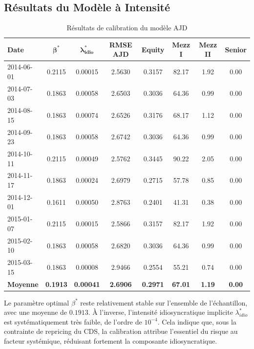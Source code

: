 \subsection{Résultats du Modèle à Intensité}

\begin{table}[H]
\centering
\caption{Résultats de calibration du modèle AJD}
\label{tab:ajd_calibration_results}
\scriptsize
\setlength{\tabcolsep}{3.5pt}
\renewcommand{\arraystretch}{1.12}
\begin{tabular}{lccccccc}
\toprule
\textbf{Date} & $\boldsymbol{\beta^{\ast}}$ & $\boldsymbol{\lambda_{idio}^{\ast}}$ & \textbf{RMSE AJD} & \textbf{Equity} & \textbf{Mezz I} & \textbf{Mezz II} & \textbf{Senior} \\
\midrule
2014-06-01 & 0.2115 & 0.00015 & 2.5630 & 0.3157 & 82.17 & 1.92 & 0.00 \\
2014-07-03 & 0.1863 & 0.00058 & 2.6503 & 0.3036 & 64.36 & 0.99 & 0.00 \\
2014-08-15 & 0.1863 & 0.00074 & 2.6526 & 0.3176 & 68.17 & 1.12 & 0.00 \\
2014-09-23 & 0.1863 & 0.00058 & 2.6742 & 0.3036 & 64.36 & 0.99 & 0.00 \\
2014-10-11 & 0.2115 & 0.00049 & 2.5762 & 0.3445 & 90.22 & 2.05 & 0.00 \\
2014-11-17 & 0.1863 & 0.00024 & 2.6979 & 0.2715 & 57.78 & 0.85 & 0.00 \\
2014-12-01 & 0.1611 & 0.00050 & 2.8763 & 0.2401 & 41.31 & 0.38 & 0.00 \\
2015-01-07 & 0.2115 & 0.00015 & 2.5866 & 0.3157 & 82.17 & 1.92 & 0.00 \\
2015-02-10 & 0.1863 & 0.00058 & 2.6820 & 0.3036 & 64.36 & 0.99 & 0.00 \\
2015-03-15 & 0.1863 & 0.00008 & 2.9466 & 0.2554 & 55.21 & 0.74 & 0.00 \\
\midrule
\textbf{Moyenne} & \textbf{0.1913} & \textbf{0.00041} & \textbf{2.6906} & \textbf{0.2971} & \textbf{67.01} & \textbf{1.19} & \textbf{0.00} \\
\bottomrule
\end{tabular}
\end{table}

Le paramètre optimal $\beta^{\ast}$ reste relativement stable sur l'ensemble de l'échantillon, avec une moyenne de $0.1913$. À l'inverse, l'intensité idiosyncratique implicite $\lambda_{idio}^{\ast}$ est systématiquement très faible, de l'ordre de $10^{-4}$. Cela indique que, sous la contrainte de repricing du CDS, la calibration attribue l'essentiel du risque au facteur systémique, réduisant fortement la composante idiosyncratique.

